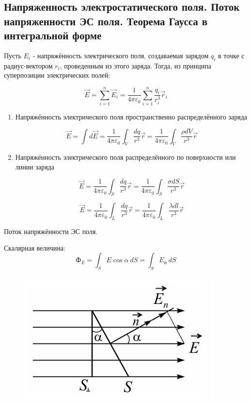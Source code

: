 \subsection{Напряженность электростатического поля. Поток напряженности ЭС поля. Теорема Гаусса в интегральной форме}

\begin{definition}
    Пусть $E_i$ - напряжённость электрического поля, создаваемая зарядом $q_i$ в точке с радиус-вектором
    $r_i$, проведенным из этого заряда. Тогда, из принципа суперпозиции электрических полей:

    $$
    \vec E=\sum_{i=1}^n\vec E_i=\frac{1}{4\pi\varepsilon_0}\sum_{i=1}^{n}\frac{q_i}{r^3_i}\vec r_i$$
\end{definition}

\begin{enumerate}
    \item Напряжённость электрического поля пространственно распределённого заряда
    
    $$\vec E=\int d\vec E=\frac{1}{4\pi\varepsilon_0}\int_V\frac{dq}{r^3}\vec r=\frac{1}{4\pi\varepsilon_0}\int_V\frac{\rho dV}{r^3}\vec r$$

    \item Напряжённость электрического поля распределённого по поверхности или линии заряда
    
    $$\vec E=\frac{1}{4\pi\varepsilon_0}\int_S\frac{dq}{r^3}\vec r=\frac{1}{4\pi\varepsilon_0}\int_S\frac{\sigma dS}{r^3}\vec r$$
    
    $$\vec E=\frac{1}{4\pi\varepsilon_0}\int_L\frac{dq}{r^3}\vec r=\frac{1}{4\pi\varepsilon_0}\int_L\frac{\lambda dl}{r^3}\vec r$$

\end{enumerate}

\begin{definition}
    Поток напряжённости ЭС поля.

    Скалярная величина:
    $$Ф_E=\int_SE\cos\alpha\ dS=\int_SE_п\ dS$$
\end{definition}

\begin{figure}[h]
    \centering
    \includegraphics[width=0.5\linewidth]{imgs/q16i1.png}
\end{figure}

